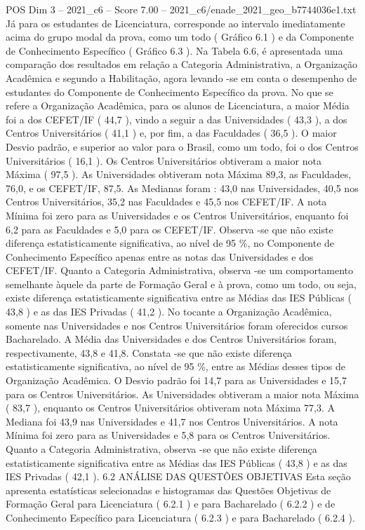 \begin{textsample}{POS Dim 3 – 2021\_c6 – Score 7.00 – 2021\_c6/enade\_2021\_geo\_b7744036e1.txt}
Já para os estudantes de Licenciatura, corresponde ao intervalo imediatamente acima do grupo modal da prova, como um todo ( Gráfico 6.1 ) e da Componente de Conhecimento Específico ( Gráfico 6.3 ).
Na Tabela 6.6, é apresentada uma comparação dos resultados em relação a Categoria Administrativa, a Organização Acadêmica e segundo a Habilitação, agora levando -se em conta o desempenho de estudantes do Componente de Conhecimento Específico da prova.
No que se refere a Organização Acadêmica, para os alunos de Licenciatura, a maior Média foi a dos CEFET/IF ( 44,7 ), vindo a seguir a das Universidades ( 43,3 ), a dos Centros Universitários ( 41,1 ) e, por fim, a das Faculdades ( 36,5 ).
O maior Desvio padrão, e superior ao valor para o Brasil, como um todo, foi o dos Centros Universitários ( 16,1 ).
Os Centros Universitários obtiveram a maior nota Máxima ( 97,5 ).
As Universidades obtiveram nota Máxima 89,3, as Faculdades, 76,0, e os CEFET/IF, 87,5.
As Medianas foram : 43,0 nas Universidades, 40,5 nos Centros Universitários, 35,2 nas Faculdades e 45,5 nos CEFET/IF.
A nota Mínima foi zero para as Universidades e os Centros Universitários, enquanto foi 6,2 para as Faculdades e 5,0 para os CEFET/IF.
Observa -se que não existe diferença estatisticamente significativa, ao nível de 95 \%, no Componente de Conhecimento Específico apenas entre as notas das Universidades e dos CEFET/IF.
Quanto a Categoria Administrativa, observa -se um comportamento semelhante àquele da parte de Formação Geral e à prova, como um todo, ou seja, existe diferença estatisticamente significativa entre as Médias das IES Públicas ( 43,8 ) e as das IES Privadas ( 41,2 ).
No tocante a Organização Acadêmica, somente nas Universidades e nos Centros Universitários foram oferecidos cursos Bacharelado.
A Média das Universidades e dos Centros Universitários foram, respectivamente, 43,8 e 41,8.
Constata -se que não existe diferença estatisticamente significativa, ao nível de 95 \%, entre as Médias desses tipos de Organização Acadêmica.
O Desvio padrão foi 14,7 para as Universidades e 15,7 para os Centros Universitários.
As Universidades obtiveram a maior nota Máxima ( 83,7 ), enquanto os Centros Universitários obtiveram nota Máxima 77,3.
A Mediana foi 43,9 nas Universidades e 41,7 nos Centros Universitários.
A nota Mínima foi zero para as Universidades e 5,8 para os Centros Universitários.
Quanto a Categoria Administrativa, observa -se que não existe diferença estatisticamente significativa entre as Médias das IES Públicas ( 43,8 ) e as das IES Privadas ( 42,1 ). 6.2 ANÁLISE DAS QUESTÕES OBJETIVAS Esta seção apresenta estatísticas selecionadas e histogramas das Questões Objetivas de Formação Geral para Licenciatura ( 6.2.1 ) e para Bacharelado ( 6.2.2 ) e de Conhecimento Específico para Licenciatura ( 6.2.3 ) e para Bacharelado ( 6.2.4 ).

\end{textsample}
